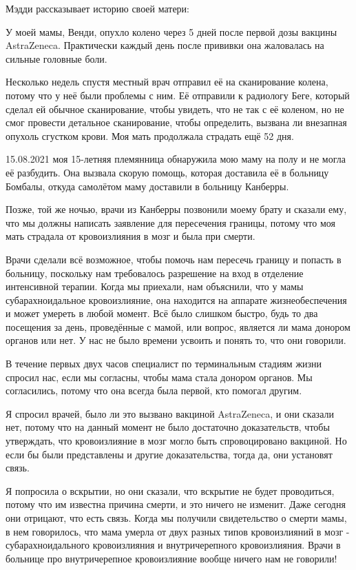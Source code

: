 Мэдди рассказывает историю своей матери:

У моей мамы, Венди, опухло колено через 5 дней после первой дозы вакцины
AstraZeneca. Практически каждый день после прививки она жаловалась на сильные
головные боли.

Несколько недель спустя местный врач отправил её на сканирование колена, потому
что у неё были проблемы с ним. Её отправили к радиологу Беге, который сделал ей
обычное сканирование, чтобы увидеть, что не так с её коленом, но не смог
провести детальное сканирование, чтобы определить, вызвана ли внезапная опухоль
сгустком крови. Моя мать продолжала страдать ещё 52 дня.

15.08.2021 моя 15-летняя племянница обнаружила мою маму на полу и не могла её
разбудить. Она вызвала скорую помощь, которая доставила её в больницу Бомбалы,
откуда самолётом маму доставили в больницу Канберры.

Позже, той же ночью, врачи из Канберры позвонили моему брату и сказали ему, что
мы должны написать заявление для пересечения границы, потому что моя мать
страдала от кровоизлияния в мозг и была при смерти.

Врачи сделали всё возможное, чтобы помочь нам пересечь границу и попасть в
больницу, поскольку нам требовалось разрешение на вход в отделение интенсивной
терапии. Когда мы приехали, нам объяснили, что у мамы субарахноидальное
кровоизлияние, она находится на аппарате жизнеобеспечения и может умереть в
любой момент.  Всё было слишком быстро, будь то два посещения за день,
проведённые с мамой, или вопрос, является ли мама донором органов или нет. У нас
не было времени усвоить и понять то, что они говорили.

В течение первых двух часов специалист по терминальным стадиям жизни спросил
нас, если мы согласны, чтобы мама стала донором органов. Мы согласились, потому
что она всегда была первой, кто помогал другим.

Я спросил врачей, было ли это вызвано вакциной AstraZeneca, и они сказали нет,
потому что на данный момент не было достаточно доказательств, чтобы утверждать,
что кровоизлияние в мозг могло быть спровоцировано вакциной. Но если бы были
представлены и другие доказательства, тогда да, они установят связь.

Я попросила о вскрытии, но они сказали, что вскрытие не будет проводиться,
потому что им известна причина смерти, и это ничего не изменит.  Даже сегодня
они отрицают, что есть связь.  Когда мы получили свидетельство о смерти мамы, в
нем говорилось, что мама умерла от двух разных типов кровоизлияний в мозг -
субарахноидального кровоизлияния и внутричерепного кровоизлияния. Врачи в
больнице про внутричерепное кровоизлияние вообще ничего нам не говорили!

